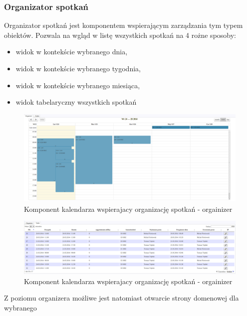 	\subsubsection{Organizator spotkań}
		Organizator spotkań jest komponentem wspierającym zarządzania tym typem obiektów. 
		Pozwala na wgląd w listę wszystkich spotkań na 4 rożne sposoby:
		\begin{itemize}
			\item widok w kontekście wybranego dnia,
			\item widok w kontekście wybranego tygodnia,
			\item widok w kontekście wybranego miesiąca,
			\item widok tabelaryczny wszystkich spotkań
		\end{itemize}
		\begin{figure}[H]
			\centering
			\includegraphics[width=1.0\textwidth]{images/calendarComponent-organizer}
			\caption[Komponent kalendarza wspierajacy organizację spotkań - orgainizer]{
				Komponent kalendarza wspierajacy organizację spotkań - orgainizer		
			}
			\label{app:component_calendar_organizer}
		\end{figure}	
		\begin{figure}[H]
			\centering
			\includegraphics[width=1.0\textwidth]{images/calendarComponent-table}
			\caption[Komponent kalendarza wspierajacy organizację spotkań - tabela]{
				Komponent kalendarza wspierajacy organizację spotkań - orgainizer	
			}
			\label{app:component_calendar_table}
		\end{figure}	
		Z poziomu organizera możliwe jest natomiast otwarcie strony domenowej dla wybranego
